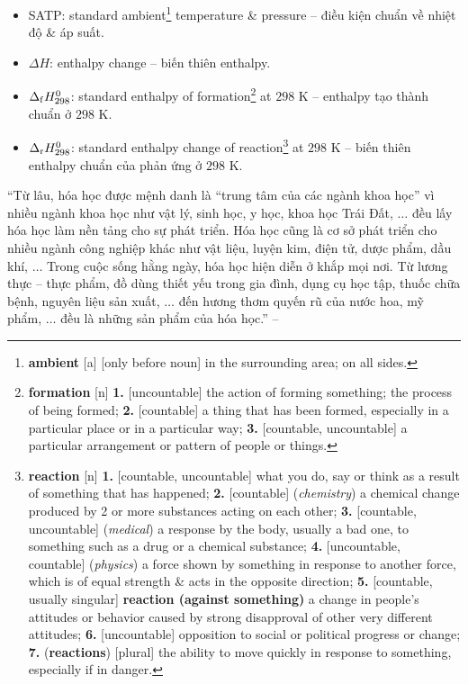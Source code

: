 \documentclass{article}
\numberwithin{equation}{section}
\begin{document}
\begin{itemize}
	\item SATP: standard ambient\footnote{\textbf{ambient} [a] [only before noun] in the surrounding area; on all sides.} temperature \& pressure -- điều kiện chuẩn về nhiệt độ \& áp suất.
	\item $\Delta H$: enthalpy change -- biến thiên enthalpy.
	\item $\Delta_{\rm f}H_{298}^0$: standard enthalpy of formation\footnote{\textbf{formation} [n] \textbf{1.} [uncountable] the action of forming something; the process of being formed; \textbf{2.} [countable] a thing that has been formed, especially in a particular place or in a particular way; \textbf{3.} [countable, uncountable] a particular arrangement or pattern of people or things.} at $298$ K -- enthalpy tạo thành chuẩn ở $298$ K.
	\item $\Delta_{\rm r}H_{298}^0$: standard enthalpy change of reaction\footnote{\textbf{reaction} [n] \textbf{1.} [countable, uncountable] what you do, say or think as a result of something that has happened; \textbf{2.} [countable] (\textit{chemistry}) a chemical change produced by 2 or more substances acting on each other; \textbf{3.} [countable, uncountable] (\textit{medical}) a response by the body, usually a bad one, to something such as a drug or a chemical substance; \textbf{4.} [uncountable, countable] (\textit{physics}) a force shown by something in response to another force, which is of equal strength \& acts in the opposite direction; \textbf{5.} [countable, usually singular] \textbf{reaction (against something)} a change in people's attitudes or behavior caused by strong disapproval of other very different attitudes; \textbf{6.} [uncountable] opposition to social or political progress or change; \textbf{7.} (\textbf{reactions}) [plural] the ability to move quickly in response to something, especially if in danger.} at $298$ K -- biến thiên enthalpy chuẩn của phản ứng ở $298$ K.
\end{itemize}
``Từ lâu, hóa học được mệnh danh là ``trung tâm của các ngành khoa học'' vì nhiều ngành khoa học như vật lý, sinh học, y học, khoa học Trái Đất, $\ldots$ đều lấy hóa học làm nền tảng cho sự phát triển. Hóa học cũng là cơ sở phát triển cho nhiều ngành công nghiệp khác như vật liệu, luyện kim, điện tử, dược phẩm, dầu khí, $\ldots$ Trong cuộc sống hằng ngày, hóa học hiện diễn ở khắp mọi nơi. Từ lương thực -- thực phẩm, đồ dùng thiết yếu trong gia đình, dụng cụ học tập, thuốc chữa bệnh, nguyên liệu sản xuất, $\ldots$ đến hương thơm quyến rũ của nước hoa, mỹ phẩm, $\ldots$ đều là những sản phẩm của hóa học.'' -- \cite[p. 3]{SGK_Hoa_Hoc_10_Chan_Troi_Sang_Tao}
\end{document}
